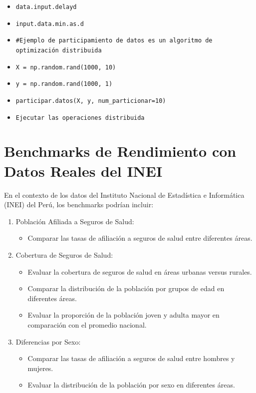 	\begin{itemize}
		\item \texttt{data.input.delayd}
		\item \texttt{input.data.min.as.d}
		\item \texttt{\#Ejemplo de participamiento de datos es un algoritmo de optimización distribuida}
		\item \texttt{X = np.random.rand(1000, 10)}
		\item \texttt{y = np.random.rand(1000, 1)}
		\item \texttt{participar.datos(X, y, num\_particionar=10)}
		\item \texttt{Ejecutar las operaciones distribuida}
	\end{itemize}
	
	\section{Benchmarks de Rendimiento con Datos Reales del INEI}
	
	En el contexto de los datos del Instituto Nacional de Estadística e Informática (INEI) del Perú, los benchmarks podrían incluir:
	
	\begin{enumerate}
		\item Población Afiliada a Seguros de Salud:
		\begin{itemize}
			\item Comparar las tasas de afiliación a seguros de salud entre diferentes áreas.
		\end{itemize}
		\item Cobertura de Seguros de Salud:
		\begin{itemize}
			\item Evaluar la cobertura de seguros de salud en áreas urbanas versus rurales.
			\item Comparar la distribución de la población por grupos de edad en diferentes áreas.
			\item Evaluar la proporción de la población joven y adulta mayor en comparación con el promedio nacional.
		\end{itemize}
		\item Diferencias por Sexo:
		\begin{itemize}
			\item Comparar las tasas de afiliación a seguros de salud entre hombres y mujeres.
			\item Evaluar la distribución de la población por sexo en diferentes áreas.
		\end{itemize}
	\end{enumerate}
	
